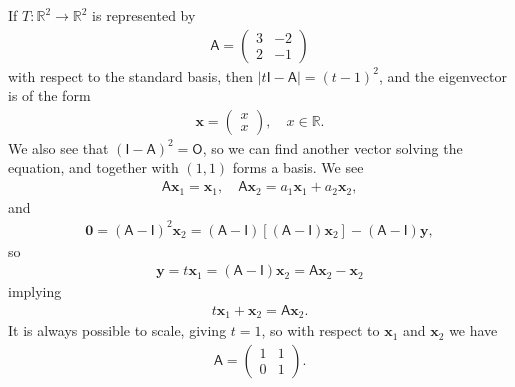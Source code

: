 \documentclass[letter-paper]{tufte-book}
\newenvironment{example}[1][Example]{\begin{trivlist}
\item[\hskip \labelsep {\bfseries #1}]}{\end{trivlist}}
\newcommand{\As}{{\mathsf{A}}}
\newcommand{\Is}{{\mathsf{I}}}
\newcommand{\Ob}{{\boldsymbol{0}}}
\newcommand{\xb}{{\boldsymbol{x}}}
\newcommand{\yb}{{\boldsymbol{y}}}
\begin{document}
\begin{example}
  If $T:\mathbb{R}^2 \to \mathbb{R}^2$ is represented by
  \begin{align*}
    \As = \begin{pmatrix} 3 & -2 \\ 2 & -1 \end{pmatrix}
  \end{align*}
  with respect to the standard basis, then $|t\Is - \As| = (t-1)^2$, and the eigenvector is of the form
  \begin{align*}
    \xb = \begin{pmatrix}x \\ x \end{pmatrix}, \quad x\in\mathbb{R}.
  \end{align*}
  We also see that $(\Is - \As)^2 = \mathsf{O}$, so we can find another vector solving the equation, and together with $(1,1)$ forms a basis. We see
  \begin{align*}
    \As \xb_1 = \xb_1, \quad \As \xb_2 = a_1 \xb_1 + a_2 \xb_2,
  \end{align*}
  and
  \begin{align*}
    \Ob = (\As - \Is)^2 \xb_2 = (\As - \Is)[(\As - \Is)\xb_2] - (\As - \Is)\yb,
  \end{align*}
  so
  \begin{align*}
    \yb = t \xb_1 = (\As - \Is) \xb_2 = \As \xb_2 - \xb_2
  \end{align*}
  implying
  \begin{align*}
    t\xb_1 + \xb_2 = \As \xb_2.
  \end{align*}
  It is always possible to scale, giving $t=1$, so with respect to $\xb_1$ and $\xb_2$ we have
  \begin{align*}
    \As = \begin{pmatrix} 1 & 1 \\ 0 & 1 \end{pmatrix}.
  \end{align*}
\end{example}
\end{document}
